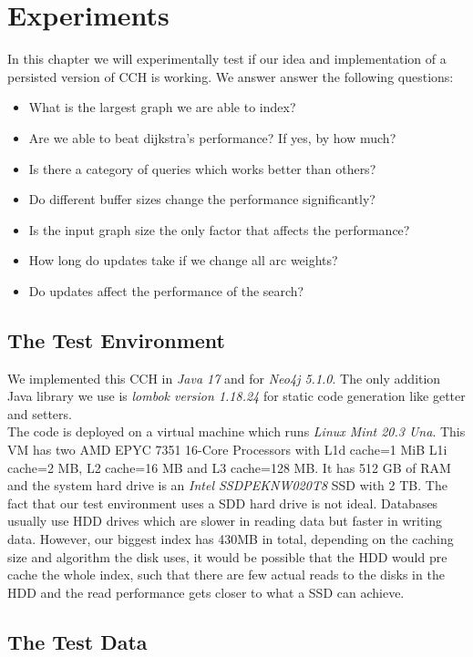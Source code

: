\chapter{Experiments}

In this chapter we will experimentally test if our idea and implementation of a persisted version of CCH is working.
We answer answer the following questions:
\begin{itemize}
    \item What is the largest graph we are able to index?
    \item Are we able to beat dijkstra's performance? If yes, by how much?
    \item Is there a category of queries which works better than others?
    \item Do different buffer sizes change the performance significantly?
    \item Is the input graph size the only factor that affects the performance?
    \item How long do updates take if we change all arc weights?
    \item Do updates affect the performance of the search?
\end{itemize}

\section{The Test Environment}

We implemented this CCH in \textit{Java 17} and for \textit{Neo4j 5.1.0}.
The only addition Java library we use is \textit{lombok version 1.18.24} for static code generation like getter and setters.
\\
The code is deployed on a virtual machine which runs \textit{Linux Mint 20.3 Una}.
This VM has two  AMD EPYC 7351 16-Core Processors with L1d cache=1 MiB L1i cache=2 MB, L2 cache=16 MB and L3 cache=128 MB.
It has 512 GB of RAM and the system hard drive is an \textit{Intel SSDPEKNW020T8} SSD with 2 TB.
The fact that our test environment uses a SDD hard drive is not ideal.
Databases usually use HDD drives which are slower in reading data but faster in writing data.
However, our biggest index has 430MB in total, depending on the caching size and algorithm the disk uses, it would be possible that 
the HDD would pre cache the whole index, such that there are few actual reads to the disks in the HDD and the read performance gets closer to what a SSD can achieve.

\section{The Test Data}

